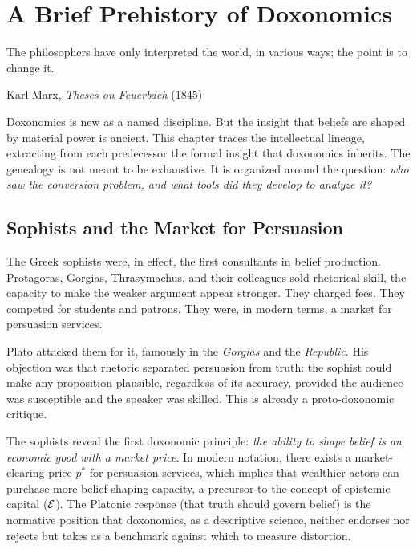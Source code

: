 \chapter{A Brief Prehistory of Doxonomics}
\label{ch:prehistory}

\epigraph{The philosophers have only interpreted the world, in various ways; the point is to change it.}{Karl Marx, \textit{Theses on Feuerbach} (1845)}

\noindent
Doxonomics is new as a named discipline.
But the insight that beliefs are shaped by material power is ancient.
This chapter traces the intellectual lineage, extracting from each predecessor the formal insight that doxonomics inherits.
The genealogy is not meant to be exhaustive. It is organized around the question: \emph{who saw the conversion problem, and what tools did they develop to analyze it?}


\section{Sophists and the Market for Persuasion}
\label{sec:ch3-sophists}

The Greek sophists were, in effect, the first consultants in belief production.
Protagoras, Gorgias, Thrasymachus, and their colleagues sold rhetorical skill, the capacity to make the weaker argument appear stronger.
They charged fees.
They competed for students and patrons.
They were, in modern terms, a market for persuasion services.

Plato attacked them for it, famously in the \textit{Gorgias} and the \textit{Republic}.
His objection was that rhetoric separated persuasion from truth: the sophist could make any proposition plausible, regardless of its accuracy, provided the audience was susceptible and the speaker was skilled.
This is already a proto-doxonomic critique.

\begin{remark}
The sophists reveal the first doxonomic principle: \emph{the ability to shape belief is an economic good with a market price}.
In modern notation, there exists a market-clearing price $p^*$ for persuasion services, which implies that wealthier actors can purchase more belief-shaping capacity, a precursor to the concept of epistemic capital ($\mathcal{E}$).
The Platonic response (that truth should govern belief) is the normative position that doxonomics, as a descriptive science, neither endorses nor rejects but takes as a benchmark against which to measure distortion.
\end{remark}

